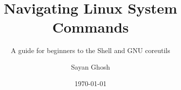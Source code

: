 \documentclass[
	a4paper, %
	fontsize=10pt, %
	twoside=true, %
	numbers=noenddot, %
]{kaobook}
\begin{document}


\title{Navigating Linux System Commands}
\subtitle{A guide for beginners to the Shell and GNU coreutils}

\author{Sayan Ghosh}

\date{\today}

\publishers{IIT Madras \\ BS Data Science and Applications}


\frontmatter %




\makeatletter
\uppertitleback{\@titlehead} %
\end{document}
